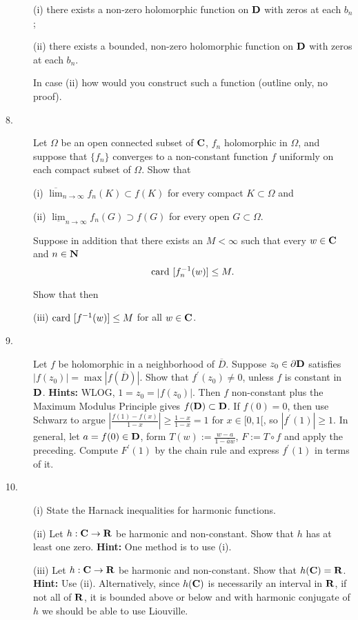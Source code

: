 \documentclass{article}
\begin{document}
\begin{description}
(i) there exists a non-zero holomorphic function on ${\bf D}$ with zeros at each
$b_n$;

(ii) there exists a bounded, non-zero holomorphic function on ${\bf D}$ with
zeros at each $b_n$.

In case (ii) how would you construct such a function (outline only, no proof).

\item[8.]
Let $\Omega$ be an open connected subset of ${\bf C}$, $f_n$ holomorphic in
$\Omega$, and suppose that $\{f_n\}$ converges to a non-constant function
$f$ uniformly on each compact subset of $\Omega$. Show that

\item[\quad] (i)
$\overline \lim_{n \to \infty} f_n (K) \subset f(K)$ for every compact
$K \subset \Omega$ and

\item[\quad] (ii)
$\underline {\lim}_{n \to \infty} f_n (G) \supset f(G)$ for every open
$G \subset \Omega$.

Suppose in addition that there exists an $M < \infty$ such that every
$w \in {\bf C}$ and $n \in {\bf N}$
$$\hbox{card\ } [f^{-1}_n (w) ] \leq M.$$

Show that then

\item[\quad] (iii)
$\hbox{card\ } [f^{-1} (w)] \leq M$ for all $w  \in {\bf C}$.

\item[9.]
Let $f$ be holomorphic in a neighborhood of $\overline D$. Suppose
$z_0 \in \partial {\bf D}$ satisfies $|f(z_0)| = \max |f(\overline D)|$. Show that
$f^\prime (z_0) \neq 0$, unless $f$ is constant in ${\bf D}$.
{\bf Hints:} WLOG, $1 = z_0 = |f(z_0)|$. Then $f$ non-constant plus the
Maximum Modulus Principle gives $f({\bf D}) \subset {\bf D}$. If $f(0) = 0$, then
use Schwarz to argue
$\left|\frac{f(1)-f(x)}{1-x} \right| \geq \frac{1-x}{1-x} = 1$
for $x \in [0,1[$, so $|f^\prime (1)| \geq 1$. In general, let
$a = f(0) \in {\bf D}$, form $T(w) := \frac{w-a}{1-\overline a w}$,
$F := T \circ f$ and apply the preceding. Compute $F^\prime (1)$ by the
chain rule and express $f^\prime (1)$ in terms of it.

\item[10.] (i)
State the Harnack inequalities for harmonic functions.

\item[\quad] (ii)
Let $h :{\bf C} \to {\bf R}$ be harmonic and non-constant. Show that $h$ has at least
one zero. {\bf Hint:} One method is to use (i).

\item[\quad] (iii)
Let $h : {\bf C} \to {\bf R}$ be harmonic and non-constant. Show that
$h({\bf C}) = {\bf R}$. {\bf Hint:} Use (ii). Alternatively, since $h({\bf C})$ is
necessarily an interval in ${\bf R}$, if not all of ${\bf R}$, it is bounded above
or below and with harmonic conjugate of $h$ we should be
able to use Liouville.





\end{description}    
\end{document}
